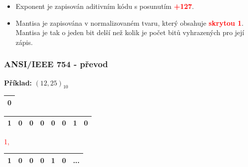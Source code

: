 \begin{frame}
\begin{itemize}
      \item Exponent je zapisován aditivním kódu s posunutím \textcolor{red}{\textbf{+127}}.
      \item Mantisa je zapisována v normalizovaném tvaru, který obsahuje \textcolor{red}{\textbf{skrytou 1}}. Mantisa je tak o jeden bit delší než kolik je počet bitů vyhrazených pro její zápis.
    \end{itemize}

	\end{frame}
  
  \begin{frame}
    \frametitle{ANSI/IEEE 754 - převod}
    \boldmath
    \textbf{Příklad:} $(12,25)_{10}$
    \vspace{3mm}
    
    \begin{minipage}[t][0.2\textheight][t]{0.1\textwidth}
    \begin{center}
      
      \begin{tabular}{|c|}
      \hline
      0 \\
      \hline
      \end{tabular}
    \end{center}
    \end{minipage}
    \begin{minipage}[t][0.2\textheight][t]{0.44\textwidth}
    \begin{center}
    
      \begin{tabular}{|c|c|c|c|c|c|c|c|}
      \hline
      1 & 0 & 0 & 0 & 0 & 0 & 1 & 0 \\
      \hline
      \end{tabular}
    \end{center}
    \end{minipage}
    \begin{minipage}[t][0.2\textheight][t]{0.44\textwidth}
    \begin{center}
      \textcolor{red}{1,}
      \begin{tabular}{|c|c|c|c|c|c|c}
      \hline
      1 & 0 & 0 & 0 & 1 & 0 & ...\\
      \hline
      \end{tabular}
    \end{center}
    \end{minipage}
    

\end{frame}
